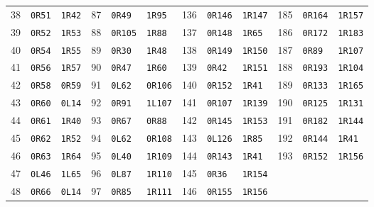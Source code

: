 \begin{center}
\begin{tabular}{rll@{\hspace{12pt}}rll@{\hspace{12pt}}rll@{\hspace{12pt}}rll}
38 & \texttt{0R51} & \texttt{1R42} & 87 & \texttt{0R49} & \texttt{1R95} & 136 & \texttt{0R146} & \texttt{1R147} & 185 & \texttt{0R164} & \texttt{1R157}\\
39 & \texttt{0R52} & \texttt{1R53} & 88 & \texttt{0R105} & \texttt{1R88} & 137 & \texttt{0R148} & \texttt{1R65} & 186 & \texttt{0R172} & \texttt{1R183}\\
40 & \texttt{0R54} & \texttt{1R55} & 89 & \texttt{0R30} & \texttt{1R48} & 138 & \texttt{0R149} & \texttt{1R150} & 187 & \texttt{0R89} & \texttt{1R107}\\
41 & \texttt{0R56} & \texttt{1R57} & 90 & \texttt{0R47} & \texttt{1R60} & 139 & \texttt{0R42} & \texttt{1R151} & 188 & \texttt{0R193} & \texttt{1R104}\\
42 & \texttt{0R58} & \texttt{0R59} & 91 & \texttt{0L62} & \texttt{0R106} & 140 & \texttt{0R152} & \texttt{1R41} & 189 & \texttt{0R133} & \texttt{1R165}\\
43 & \texttt{0R60} & \texttt{0L14} & 92 & \texttt{0R91} & \texttt{1L107} & 141 & \texttt{0R107} & \texttt{1R139} & 190 & \texttt{0R125} & \texttt{1R131}\\
44 & \texttt{0R61} & \texttt{1R40} & 93 & \texttt{0R67} & \texttt{0R88} & 142 & \texttt{0R145} & \texttt{1R153} & 191 & \texttt{0R182} & \texttt{1R144}\\
45 & \texttt{0R62} & \texttt{1R52} & 94 & \texttt{0L62} & \texttt{0R108} & 143 & \texttt{0L126} & \texttt{1R85} & 192 & \texttt{0R144} & \texttt{1R41}\\
46 & \texttt{0R63} & \texttt{1R64} & 95 & \texttt{0L40} & \texttt{1R109} & 144 & \texttt{0R143} & \texttt{1R41} & 193 & \texttt{0R152} & \texttt{1R156}\\
47 & \texttt{0L46} & \texttt{1L65} & 96 & \texttt{0L87} & \texttt{1R110} & 145 & \texttt{0R36} & \texttt{1R154} &  &  & \\
48 & \texttt{0R66} & \texttt{0L14} & 97 & \texttt{0R85} & \texttt{1R111} & 146 & \texttt{0R155} & \texttt{1R156} &  &  & \\
\bottomrule\end{tabular}\end{center}
